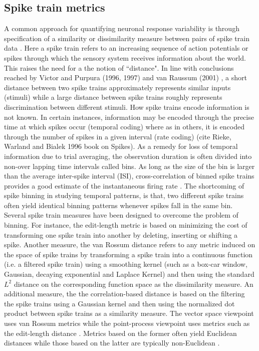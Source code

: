 \subsection{Spike train metrics}
A common approach for quantifying neuronal response variability is through specification of a 
similarity or dissimilarity measure between pairs of spike train data
\cite{Brown2004, Victor1996, Victor1998, Rossum2001,houghton2010measuring, Schreiber2003}.
Here a spike train refers to an increasing sequence of action potentials or spikes
through which the sensory system receives information about the world.
This raises the need for a the notion of ``distance". 
In line with conclusions reached by Victor and Purpura (1996, 1997) and
van Raussum (2001) \cite{Victor1996, Victor1998, Rossum2001}, a short distance between two spike trains approximately represents similar inputs (stimuli) while a large distance between spike trains roughly represents discrimination between different stimuli.
How spike trains encode information is not known. In certain instances, information may be encoded through the precise time at which spikes occur (temporal coding) where as in others, it is encoded through the number of spikes in a given interval (rate coding) (cite Rieke, Warland and Bialek 1996 book on Spikes).
As a remedy for loss of temporal information due to trial averaging, the observation duration is often divided into non-over lapping time intervals called bins.
As long as the size of the bin is larger than the average inter-spike interval (ISI), cross-correlation of binned spike trains provides a good estimate of the instantaneous firing rate
\cite{Brown2004}. The shortcoming of spike binning in studying temporal patterns, is that, two different spike trains often yield identical binning patterns whenever spikes fall in the same bin. Several spike train measures have been designed to overcome the problem of binning. For instance, the edit-length metric \cite{Victor1996, Victor1998} is based on minimizing the cost of transforming one spike train into another by deleting, inserting or shifting a spike. Another measure, the van Rossum distance \cite{Rossum2001, houghton2010measuring} refers to any metric induced on the space of spike trains by transforming a spike train into a continuous function (i.e. a filtered spike train) using a smoothing kernel (such as a box-car window, Gaussian, decaying exponential and  Laplace Kernel) and then using the standard $L^2$ distance on the corresponding function space as the dissimilarity measure. An additional measure, the the correlation-based distance \cite{Schreiber2003} is based on the filtering the spike trains using a Gaussian kernel and then using the normalized dot product between  spike trains as a  similarity measure.
The vector space viewpoint uses van Rossum metrics while the point-process viewpoint
uses metrics such as the edit-length distance \cite{Victor2005}. 
Metrics based on the former often yield  Euclidean distances while those based on the latter are typically non-Euclidean \cite{Aronov2004}.\\


